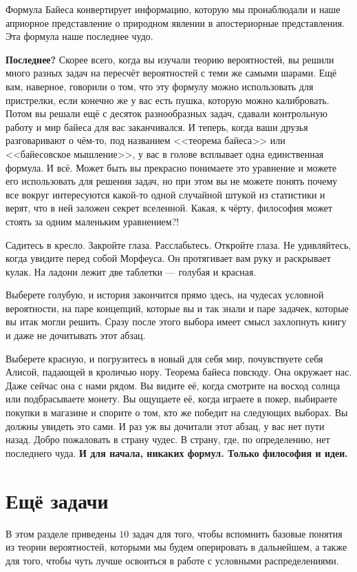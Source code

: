 \documentclass[12pt, a4paper, oneside]{extreport}
\theoremstyle{plain}              %
\theoremstyle{definition}         %
\begin{document}
Формула Байеса конвертирует информацию, которую мы пронаблюдали и наше априорное представление о природном явлении в апостериорные представления. Эта формула наше последнее чудо.  

\textbf{Последнее?} Скорее всего, когда вы изучали теорию вероятностей, вы решили много разных задач на пересчёт вероятностей с теми же самыми шарами. Ещё вам, наверное, говорили о том, что эту формулу можно использовать для пристрелки,  если конечно же у вас есть пушка, которую можно калибровать. Потом вы решали ещё с десяток разнообразных задач, сдавали контрольную работу и мир байеса для вас заканчивался. И теперь, когда ваши друзья разговаривают о чём-то, под названием <<теорема байеса>> или <<байесовское мышление>>, у вас в голове всплывает одна единственная формула. И всё. Может быть вы прекрасно понимаете это уравнение и можете его использовать для решения задач, но при этом вы не можете понять почему все вокруг интересуются какой-то одной случайной штукой из статистики и верят, что в ней заложен секрет вселенной. Какая, к чёрту, философия может стоять за одним маленьким уравнением?!

Садитесь в кресло. Закройте глаза. Расслабьтесь. Откройте глаза. Не удивляйтесь, когда увидите перед собой Морфеуса. Он протягивает вам руку и раскрывает кулак. На ладони лежит две таблетки --- голубая и красная. 

Выберете голубую, и история закончится прямо здесь, на чудесах условной вероятности, на паре концепций, которые вы и так знали и паре задачек, которые вы итак могли решить. Сразу после этого выбора имеет смысл захлопнуть книгу и даже не дочитывать этот абзац. 

Выберете красную, и погрузитесь в новый для себя мир, почувствуете себя Алисой, падающей в кроличью нору. Теорема байеса повсюду. Она окружает нас. Даже сейчас она с нами рядом. Вы видите её, когда смотрите на восход солнца или подбрасываете монету. Вы ощущаете её, когда играете в покер, выбираете покупки в магазине и спорите о том, кто же победит на следующих выборах. Вы должны увидеть это сами. И раз уж вы дочитали этот абзац, у вас нет пути назад. Добро пожаловать в страну чудес. В страну, где, по определению, нет последнего чуда. \textbf{И для начала, никаких формул. Только философия и идеи.}


\section{Ещё задачи} 

В этом разделе приведены $10$ задач для того, чтобы вспомнить базовые понятия из теории вероятностей, которыми мы будем оперировать в дальнейшем, а также для того, чтобы чуть лучше освоиться в работе с условными распределениями. 
\end{document}
